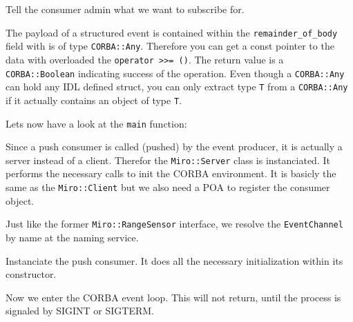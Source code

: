

Tell the consumer admin what we want to subscribe for.



The payload of a structured event is contained within the
\lstinline!remainder_of_body! field with is of type
\lstinline!CORBA::Any!.  Therefore you can get a const pointer to the
data with overloaded the \lstinline!operator >>= ()!. The return value
is a \lstinline!CORBA::Boolean! indicating success of the operation.
Even though a \lstinline!CORBA::Any! can hold any IDL defined struct,
you can only extract type \lstinline!T! from a \lstinline!CORBA::Any!
if it actually contains an object of type \lstinline!T!.



Lets now have a look at the \lstinline!main! function:



Since a push consumer is called (pushed) by the event producer, it is
actually a server instead of a client. Therefor the
\lstinline!Miro::Server!  class is instanciated. It performs the
necessary calls to init the CORBA environment. It is basicly the same
as the \lstinline!Miro::Client!  but we also need a POA to register
the consumer object.



Just like the former \lstinline!Miro::RangeSensor! interface, we
resolve the \lstinline!EventChannel! by name at the naming service.



Instanciate the push consumer. It does all the necessary
initialization within its constructor.



Now we enter the CORBA event loop. This will not return, until the
process is signaled by SIGINT or SIGTERM.

